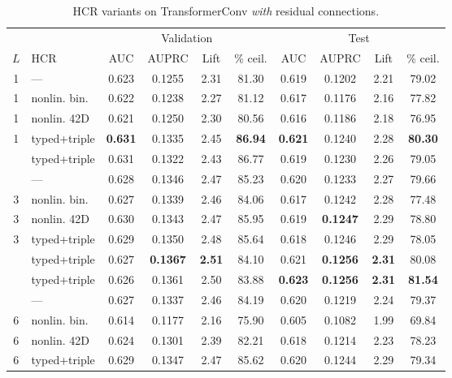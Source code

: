     \begin{table}[H]
      \centering
      \small
      \setlength{\tabcolsep}{4pt}
      \caption{HCR variants on TransformerConv \emph{with} residual connections.}
      \label{tab:hcr-res}
      \begin{tabular}{clcccccccc}
        \toprule
        & & \multicolumn{4}{c}{Validation} & \multicolumn{4}{c}{Test} \\
        \cmidrule(lr){3-6}\cmidrule(lr){7-10}
        $L$ & HCR & AUC & AUPRC & Lift & \% ceil. & AUC & AUPRC & Lift & \% ceil. \\
        \midrule
        1 & ---            & 0.623 & 0.1255 & 2.31 & 81.30 & 0.619 & 0.1202 & 2.21 & 79.02 \\
        1 & nonlin. bin.   & 0.622 & 0.1238 & 2.27 & 81.12 & 0.617 & 0.1176 & 2.16 & 77.82 \\
        1 & nonlin. 42D    & 0.621 & 0.1250 & 2.30 & 80.56 & 0.616 & 0.1186 & 2.18 & 76.95 \\
        1 & typed+triple   & \textbf{0.631} & 0.1335 & 2.45 & \textbf{86.94} & \textbf{0.621} & 0.1240 & 2.28 & \textbf{80.30} \\
        \addlinespace[4pt]
        2 & typed+triple   & 0.631 & 0.1322 & 2.43 & 86.77 & 0.619 & 0.1230 & 2.26 & 79.05 \\
        \addlinespace[4pt]
        3 & ---            & 0.628 & 0.1346 & 2.47 & 85.23 & 0.620 & 0.1233 & 2.27 & 79.66 \\
        3 & nonlin. bin.   & 0.627 & 0.1339 & 2.46 & 84.06 & 0.617 & 0.1242 & 2.28 & 77.48 \\
        3 & nonlin. 42D    & 0.630 & 0.1343 & 2.47 & 85.95 & 0.619 & \textbf{0.1247} & 2.29 & 78.80 \\
        3 & typed+triple   & 0.629 & 0.1350 & 2.48 & 85.64 & 0.618 & 0.1246 & 2.29 & 78.05 \\
        \addlinespace[4pt]
        4 & typed+triple   & 0.627 & \textbf{0.1367} & \textbf{2.51} & 84.10 & 0.621 & \textbf{0.1256} & \textbf{2.31} & 80.08 \\
        \addlinespace[4pt]
        5 & typed+triple   & 0.626 & 0.1361 & 2.50 & 83.88 & \textbf{0.623} & \textbf{0.1256} & \textbf{2.31} & \textbf{81.54} \\
        \addlinespace[4pt]
        6 & ---            & 0.627 & 0.1337 & 2.46 & 84.19 & 0.620 & 0.1219 & 2.24 & 79.37 \\
        6 & nonlin. bin.   & 0.614 & 0.1177 & 2.16 & 75.90 & 0.605 & 0.1082 & 1.99 & 69.84 \\
        6 & nonlin. 42D    & 0.624 & 0.1301 & 2.39 & 82.21 & 0.618 & 0.1214 & 2.23 & 78.23 \\
        6 & typed+triple   & 0.629 & 0.1347 & 2.47 & 85.62 & 0.620 & 0.1244 & 2.29 & 79.34 \\
        \bottomrule
      \end{tabular}
    \end{table}
    

